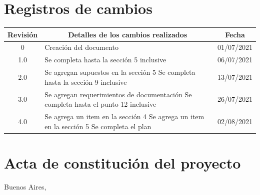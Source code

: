 \documentclass[
11pt, %
codirector, %
]{charter}
\begin{document}
\maketitle
\thispagestyle{empty}
\pagebreak


\thispagestyle{empty}
{\setlength{\parskip}{0pt}
\tableofcontents{}
}
\pagebreak


\section*{Registros de cambios}
\label{sec:registro}


\begin{table}[ht]
\label{tab:registro}
\centering
\begin{tabularx}{\linewidth}{@{}|c|X|c|@{}}
\hline
\rowcolor[HTML]{C0C0C0} 
Revisión & \multicolumn{1}{c|}{\cellcolor[HTML]{C0C0C0}Detalles de los cambios realizados} & Fecha      \\ \hline
0      & Creación del documento                              & 01/07/2021 \\ \hline
1.0      & Se completa hasta la sección 5 inclusive          & 06/07/2021 \\ \hline
2.0      & Se agregan supuestos en la sección 5 \newline
		   Se completa hasta la sección 9 inclusive				 & 13/07/2021 \\ \hline
3.0      & Se agregan requerimientos de documentación \newline
		   Se completa hasta el punto 12 inclusive               & 26/07/2021 \\ \hline
4.0      &  Se agrega un item en la sección 4 \newline
			Se agrega un item en la sección 5 \newline
            Se completa el plan	                                 & 02/08/2021 \\ \hline
\end{tabularx}
\end{table}

\pagebreak



\section*{Acta de constitución del proyecto}
\label{sec:acta}

\begin{flushright}
Buenos Aires, \fechaInicioName
\end{flushright}
\end{document}
